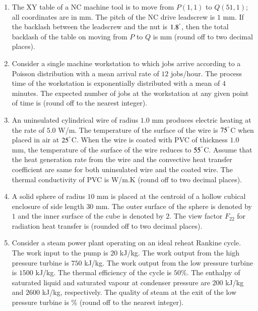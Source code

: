 \documentclass[journal]{IEEEtran}
\begin{document}
\begin{enumerate}
\item The XY table of a NC machine tool is to move from $P(1,1)$ to $Q(51,1)$; all coordinates are in mm. The pitch of the NC drive leadscrew is $1$ mm. If the backlash between the leadscrew and the nut is $1.8^\degree$, then the total backlash of the table on moving from $P$ to $Q$ is \underline{\hspace{2cm}} mm (round off to two decimal places).

\hfill{}

\item Consider a single machine workstation to which jobs arrive according to a Poisson distribution with a mean arrival rate of $12$ jobs/hour. The process time of the workstation is exponentially distributed with a mean of $4$ minutes. The expected number of jobs at the workstation at any given point of time is \underline{\hspace{2cm}} (round off to the nearest integer).

\hfill{}

\item An uninsulated cylindrical wire of radius $1.0$ mm produces electric heating at the rate of $5.0$ W/m. The temperature of the surface of the wire is $75^\degree$C when placed in air at $25^\degree$C. When the wire is coated with PVC of thickness $1.0$ mm, the temperature of the surface of the wire reduces to $55^\degree$C. Assume that the heat generation rate from the wire and the convective heat transfer coefficient are same for both uninsulated wire and the coated wire. The thermal conductivity of PVC is \underline{\hspace{2cm}} W/m.K (round off to two decimal places).

\hfill{}

\item A solid sphere of radius $10$ mm is placed at the centroid of a hollow cubical enclosure of side length $30$ mm. The outer surface of the sphere is denoted by $1$ and the inner surface of the cube is denoted by $2$. The view factor $F_{22}$ for radiation heat transfer is \underline{\hspace{2cm}} (rounded off to two decimal places).

\hfill{}

\item Consider a steam power plant operating on an ideal reheat Rankine cycle. The work input to the pump is $20$ kJ/kg. The work output from the high pressure turbine is $750$ kJ/kg. The work output from the low pressure turbine is $1500$ kJ/kg. The thermal efficiency of the cycle is $50\%$. The enthalpy of saturated liquid and saturated vapour at condenser pressure are $200$ kJ/kg and $2600$ kJ/kg, respectively. The quality of steam at the exit of the low pressure turbine is \underline{\hspace{2cm}} \% (round off to the nearest integer).


\end{enumerate}
\end{document}

